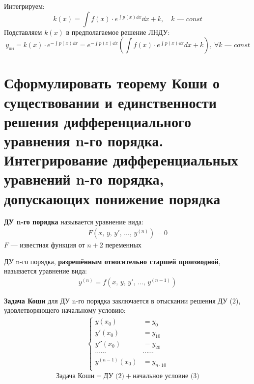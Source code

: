 Интегрируем:
\[
    k(x) = \int f(x)\cdot e^{\int p(x)\dd{x}}\dd{x} + k,\quad k \text{ --- } const
\]
Подставляем $k(x)$ в предполагаемое решение ЛНДУ:
\[
    y_{\text{он}} = k(x) \cdot e^{-\int p(x)\dd{x}} = e^{-\int p(x)\dd{x}} \left(\int f(x)\cdot e^{\int p(x)\dd{x}}dx + k\right),\ \forall k \text{ --- } const
\]

\section{Сформулировать теорему Коши о существовании и единственности решения дифференциального уравнения n-го порядка. Интегрирование дифференциальных уравнений n-го порядка, допускающих понижение порядка}
\setcounter{equation}{0}
\begin{definition}
    \textbf{ДУ n-го порядка} называется уравнение вида:
    \begin{gather}
        \boxed{F\left(x,\, y,\, y',\, \ldots,\, y^{(n)}\right) = 0}
    \end{gather}
    $F$ --- известная функция от $n+2$ переменных
\end{definition}

\begin{definition}
    ДУ n-го порядка, \textbf{разрешённым относительно старшей производной}, называется уравнение вида:
    \begin{gather}
        y^{(n)} = f\left(x,\, y,\, y',\, \ldots,\, y^{(n-1)}\right)
    \end{gather}
\end{definition}

\begin{definition}
    \textbf{Задача Коши} для ДУ n-го порядка заключается в отыскании решения ДУ (2), удовлетворяющего начальному условию:
    \begin{gather}
        \left\{ \begin{aligned}
            y(x_0) &= y_0 \\
            y'(x_0) &= y_{10} \\
            y''(x_0) &= y_{20} \\
            \cdots\cdots&\cdots\cdots \\
            y^{(n-1)}(x_0) &= y_{n\cdot 10} \\
        \end{aligned} \right.
    \end{gather}
    \[
        \text{Задача Коши} = \text{ДУ (2)} + \text{начальное условие (3)}
    \]
\end{definition}

